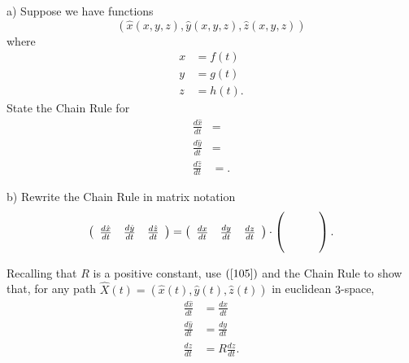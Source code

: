 \begin{exercise}
a) Suppose we have functions%
\[
\left(  \hat{x}\left(  x,y,z\right)  ,\hat{y}\left(  x,y,z\right)  ,\hat
{z}\left(  x,y,z\right)  \right)
\]
where%
\begin{align*}
x  &  =f\left(  t\right) \\
y  &  =g\left(  t\right) \\
z  &  =h\left(  t\right)  .
\end{align*}
State the Chain Rule for%
\begin{align*}
\frac{d\hat{x}}{dt}  &  =\\
\frac{d\hat{y}}{dt}  &  =\\
\frac{d\hat{z}}{dt}  &  =.
\end{align*}


b) Rewrite the Chain Rule in matrix notation%
\[
\left(
\begin{array}
[c]{ccc}%
\frac{d\hat{x}}{dt} & \frac{d\hat{y}}{dt} & \frac{d\hat{z}}{dt}%
\end{array}
\right)  =\left(
\begin{array}
[c]{ccc}%
\frac{dx}{dt} & \frac{dy}{dt} & \frac{dz}{dt}%
\end{array}
\right)  \cdot\left(
\begin{array}
[c]{ccc}
&  & \\
&  & \\
&  &
\end{array}
\right)  .
\]

\end{exercise}

\begin{exercise}
\label{8} Recalling that $R$ is a positive constant, use $\left(
\ref{105}\right)  $ and the Chain Rule to show that, for any path $\hat
{X}\left(  t\right)  =\left(  \hat{x}\left(  t\right)  ,\hat{y}\left(
t\right)  ,\hat{z}\left(  t\right)  \right)  $ in euclidean $3$-space,%
\begin{align*}
\frac{d\hat{x}}{dt}  &  =\frac{dx}{dt}\\
\frac{d\hat{y}}{dt}  &  =\frac{dy}{dt}\\
\frac{d\hat{z}}{dt}  &  =R\frac{dz}{dt}.
\end{align*}

\end{exercise}

